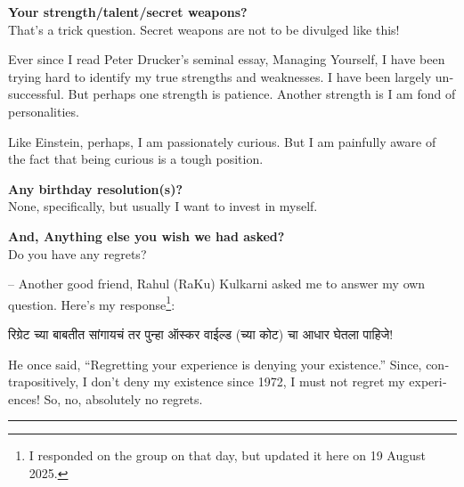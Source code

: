 \documentclass[17pt]{extarticle}  %
\begin{document}
\begin{enumerate}
\begin{english}
\item\textbf{Your strength/talent/secret weapons?}\\

That's a trick question. Secret weapons are not to be divulged like this! 

Ever since I read Peter Drucker's seminal essay, Managing Yourself, I have been trying hard to identify my true strengths and weaknesses. I have been largely unsuccessful. But perhaps one strength is patience. Another strength is I am fond of personalities.

Like Einstein, perhaps, I am passionately curious. But I am painfully aware of the fact that being curious is a tough position.

\item\textbf{Any birthday resolution(s)?}\\

None, specifically, but usually I want to invest in myself.

\item\textbf{And, Anything else you wish we had asked?}\\

Do you have any regrets?

-- Another good friend, Rahul (RaKu) Kulkarni asked me to answer my own question. Here's my response\footnote{I responded on the group on that day, but updated it here on 19 August 2025.}: 

\begin{marathi}रिग्रेट च्या बाबतीत सांगायचं तर पुन्हा ऑस्कर वाईल्ड (च्या कोट) चा आधार घेतला पाहिजे!\end{marathi} He once said, ``Regretting your experience is denying your existence.'' Since, contrapositively, I don't deny my existence since 1972, I must not regret my experiences! So, no, absolutely no regrets.
\end{english}
\end{enumerate}
\vspace{5mm}
\hrule
\end{document}
